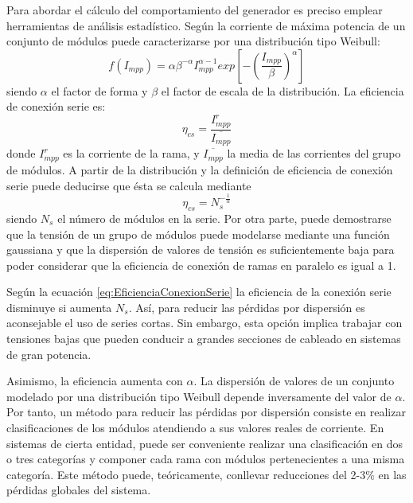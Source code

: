 Para abordar el cálculo del comportamiento del generador es preciso
emplear herramientas de análisis estadístico. Según \cite{Zilles1993}
la corriente de máxima potencia de un conjunto de módulos puede caracterizarse
por una distribución tipo Weibull:\begin{equation}
f(I_{mpp})=\alpha\beta^{-\alpha}I_{mpp}^{\alpha-1}exp\left[-\left(\frac{I_{mpp}}{\beta}\right)^{\alpha}\right]\end{equation}
siendo $\alpha$ el factor de forma y $\beta$ el factor de escala
de la distribución. La eficiencia de conexión serie es:\begin{equation}
\eta_{cs}=\frac{I_{mpp}^{r}}{\overline{I_{mpp}}}\end{equation}
donde
$I_{mpp}^{r}$ es la corriente de la rama, y $\overline{I_{mpp}}$
la media de las corrientes del grupo de módulos. A partir de la distribución
y la definición de eficiencia de conexión serie puede deducirse que
ésta se calcula mediante\begin{equation}
\eta_{cs}=N_{s}^{-\frac{1}{\alpha}}\label{eq:EficienciaConexionSerie}\end{equation}
siendo $N_{s}$ el número de módulos en la serie. Por otra parte,
puede demostrarse que la tensión de un grupo de módulos puede modelarse
mediante una función gaussiana y que la dispersión de valores de tensión
es suficientemente baja para poder considerar que la eficiencia de
conexión de ramas en paralelo es igual a 1. 

Según la ecuación \ref{eq:EficienciaConexionSerie} la eficiencia
de la conexión serie disminuye si aumenta $N_{s}$. Así, para reducir
las pérdidas por dispersión es aconsejable el uso de series cortas.
Sin embargo, esta opción implica trabajar con tensiones bajas que
pueden conducir a grandes secciones de cableado en sistemas de gran
potencia. 

Asimismo, la eficiencia aumenta con $\alpha$. La dispersión de valores
de un conjunto modelado por una distribución tipo Weibull depende
inversamente del valor de $\alpha$. Por tanto, un método para reducir
las pérdidas por dispersión consiste en realizar clasificaciones de
los módulos atendiendo a sus valores reales de corriente. En sistemas
de cierta entidad, puede ser conveniente realizar una clasificación
en dos o tres categorías y componer cada rama con módulos pertenecientes
a una misma categoría. Este método puede, teóricamente, conllevar
reducciones del 2-3\% en las pérdidas globales del sistema. 

